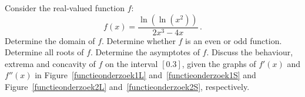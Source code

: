 \begin{Exercise} %
Consider the real-valued function $f$:
$$
f(x)=\dfrac{\ln\left(\ln\left(x^2\right)\right)}{2x^3-4x}\,.
$$
\Question Determine the domain of $f$.
\Question Determine whether $f$ is an even or odd function.
\Question Determine all roots of $f$.
\Question Determine the asymptotes of $f$.
\Question Discuss the behaviour, extrema and concavity of $f$ on the interval $[0.3]$, given the graphs of $f'(x)$ and $f''(x)$ in Figure~\ref{functieonderzoek1L} and~\ref{functieonderzoek1S} and Figure~\ref{functieonderzoek2L} and~\ref{functieonderzoek2S}, respectively.


\begin{figure}[H]
\centering

\centerline{
\hspace*{0.5cm}
}
\centerline{
\hspace*{0.5cm}
}
\caption{\label{functieonderzoek}}
\end{figure}
\EndCurrentQuestion
\end{Exercise}

